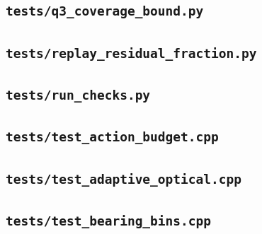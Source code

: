 \subsection*{\texttt{tests/q3\_coverage\_bound.py}}

\subsection*{\texttt{tests/replay\_residual\_fraction.py}}

\subsection*{\texttt{tests/run\_checks.py}}

\subsection*{\texttt{tests/test\_action\_budget.cpp}}

\subsection*{\texttt{tests/test\_adaptive\_optical.cpp}}

\subsection*{\texttt{tests/test\_bearing\_bins.cpp}}

